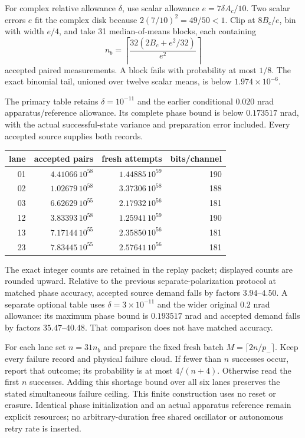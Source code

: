 For complex relative allowance $\delta$, use scalar allowance
$e=7\delta A_c/10$. Two scalar errors $e$ fit the complex disk because
$2(7/10)^2=49/50<1$. Clip at $8B_c/e$, bin with width $e/4$, and take
31 median-of-means blocks, each containing
\begin{equation}
 n_b=\left\lceil\frac{32(2B_c+e^2/32)}{e^2}\right\rceil
\end{equation}
accepted paired measurements. A block fails with probability at most $1/8$.
The exact binomial tail, unioned over twelve scalar means, is below
$1.974\times10^{-6}$.

The primary table retains $\delta=10^{-11}$ and the earlier conditional
$0.020$ nrad apparatus/reference allowance. Its complete phase bound is below
$0.173517$ nrad, with the actual successful-state variance and preparation
error included. Every accepted source supplies both records.
\begin{center}
\small
\begin{tabular}{rrrr}
lane & accepted pairs & fresh attempts & bits/channel\\\hline
01 &$4.41066\,10^{58}$&$1.44885\,10^{59}$&190\\
02 &$1.02679\,10^{58}$&$3.37306\,10^{58}$&188\\
03 &$6.62629\,10^{55}$&$2.17932\,10^{56}$&181\\
12 &$3.83393\,10^{58}$&$1.25941\,10^{59}$&190\\
13 &$7.17144\,10^{55}$&$2.35850\,10^{56}$&181\\
23 &$7.83445\,10^{55}$&$2.57641\,10^{56}$&181
\end{tabular}
\end{center}
The exact integer counts are retained in the replay packet; displayed counts
are rounded upward. Relative to the previous separate-polarization protocol
at matched phase accuracy, accepted source demand falls by factors
$3.94$--$4.50$. A separate optional table uses $\delta=3\times10^{-11}$ and
the wider original $0.2$ nrad allowance: its maximum phase bound is
$0.193517$ nrad and accepted demand falls by factors $35.47$--$40.48$.
That comparison does not have matched accuracy.

For each lane set $n=31n_b$ and prepare the fixed fresh batch
$M=\lceil2n/p_-\rceil$. Keep every failure record and physical failure
cloud. If fewer than $n$ successes occur, report that outcome; its probability
is at most $4/(n+4)$. Otherwise read the first $n$ successes. Adding this
shortage bound over all six lanes preserves the stated simultaneous failure
ceiling. This finite construction uses no reset or erasure. Identical phase
initialization and an actual apparatus reference remain explicit resources;
no arbitrary-duration free shared oscillator or autonomous retry rate is
inserted.

